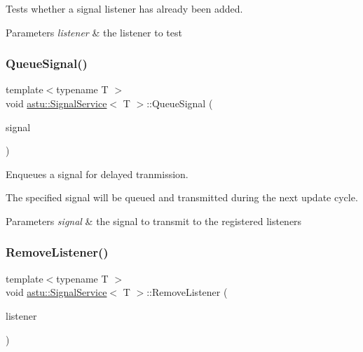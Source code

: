 Tests whether a signal listener has already been added.


\begin{DoxyParams}{Parameters}
{\em listener} & the listener to test \\
\hline
\end{DoxyParams}
\mbox{\label{classastu_1_1SignalService_aa028a039b066a779af3834ffb3bdaa18}} 
\subsubsection{\texorpdfstring{Queue\+Signal()}{QueueSignal()}}
{\footnotesize\ttfamily template$<$typename T $>$ \\
void \hyperlink{classastu_1_1SignalService}{astu\+::\+Signal\+Service}$<$ T $>$\+::Queue\+Signal (\begin{DoxyParamCaption}\item[{const T \&}]{signal }\end{DoxyParamCaption})\hspace{0.3cm}{\ttfamily [inline]}}

Enqueues a signal for delayed tranmission.

The specified signal will be queued and transmitted during the next update cycle.


\begin{DoxyParams}{Parameters}
{\em signal} & the signal to transmit to the registered listeners \\
\hline
\end{DoxyParams}
\mbox{\label{classastu_1_1SignalService_aea0777f0393a7f3c4dafff9d58934194}} 
\subsubsection{\texorpdfstring{Remove\+Listener()}{RemoveListener()}}
{\footnotesize\ttfamily template$<$typename T $>$ \\
void \hyperlink{classastu_1_1SignalService}{astu\+::\+Signal\+Service}$<$ T $>$\+::Remove\+Listener (\begin{DoxyParamCaption}\item[{const std\+::shared\+\_\+ptr$<$ \hyperlink{classastu_1_1ISignalListener}{I\+Signal\+Listener}$<$ T $>$$>$ \&}]{listener }\end{DoxyParamCaption})\hspace{0.3cm}{\ttfamily [inline]}}

